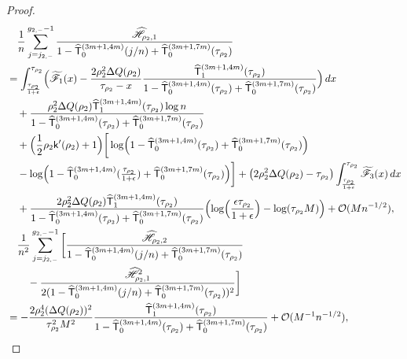 \documentclass[a4paper]{article}
\numberwithin{equation}{section}
\begin{document}
\begin{proof}
\begin{align*}
&\quad \frac{1}{n}
\sum_{j=j_{2,-}}^{g_{2,-}-1}\frac{\widehat{\mathscr{H}}_{\rho_2,1}}{1-\widehat{\mathsf{T}}_0^{(3m+1,4m)}(j/n)+\widehat{\mathsf{T}}_0^{(3m+1,7m)}(\tau_{\rho_2})}
\\
&=
\int_{\frac{\tau_{\rho_2}}{1+\epsilon}}^{\tau_{\rho_2}}
\Bigl(\widetilde{\mathscr{F}}_1(x)
-\frac{2\rho_2^2\Delta Q(\rho_2)}{\tau_{\rho_2}-x}
\frac{
\widehat{\mathsf{T}}_{1}^{(3m+1,4m)}(\tau_{\rho_2})}{1-\widehat{\mathsf{T}}_0^{(3m+1,4m)}(\tau_{\rho_2})+\widehat{\mathsf{T}}_0^{(3m+1,7m)}(\tau_{\rho_2})}
\Bigr) \,dx 
\\
&\quad
+
\frac{\rho_2^2\Delta Q(\rho_2)\widehat{\mathsf{T}}_{1}^{(3m+1,4m)}(\tau_{\rho_2})\log n}{1-\widehat{\mathsf{T}}_0^{(3m+1,4m)}(\tau_{\rho_2})+\widehat{\mathsf{T}}_0^{(3m+1,7m)}(\tau_{\rho_2})}
\\
&
\quad
+
\Bigl(\frac{1}{2}\rho_2\mathsf{k}'(\rho_2)+1\Bigr)
\bigg[
\log\Bigl(1-\widehat{\mathsf{T}}_0^{(3m+1,4m)}(\tau_{\rho_2})+\widehat{\mathsf{T}}_0^{(3m+1,7m)}(\tau_{\rho_2})\Bigr)
\\
&\quad 
-
\log\Bigl(1-\widehat{\mathsf{T}}_0^{(3m+1,4m)}(\tfrac{\tau_{\rho_2}}{1+\epsilon})+\widehat{\mathsf{T}}_0^{(3m+1,7m)}(\tau_{\rho_2})\Bigr)
\bigg]
+\bigl( 
2\rho_2^2\Delta Q(\rho_2)-\tau_{\rho_2}
\bigr)\int_{\frac{\tau_{\rho_2}}{1+\epsilon}}^{\tau_{\rho_2}}\widetilde{\mathscr{F}}_3(x)\,dx
\\
&\quad 
+
\frac{2\rho_2^2\Delta Q(\rho_2)\widehat{\mathsf{T}}_{1}^{(3m+1,4m)}(\tau_{\rho_2})}{1-\widehat{\mathsf{T}}_0^{(3m+1,4m)}(\tau_{\rho_2})+\widehat{\mathsf{T}}_0^{(3m+1,7m)}(\tau_{\rho_2})}
\Bigl( 
\log\Bigl(\frac{\epsilon\tau_{\rho_2}}{1+\epsilon}\Bigr)-\log (\tau_{\rho_2}M)
\Bigr)
+\mathcal{O}(Mn^{-1/2}),
\\
&\quad \frac{1}{n^2}\sum_{j=j_{2,-}}^{g_{2,-}-1}
\bigg[
\frac{\widehat{\mathscr{H}}_{\rho_2,2}}{1-\widehat{\mathsf{T}}_0^{(3m+1,4m)}(j/n)+\widehat{\mathsf{T}}_0^{(3m+1,7m)}(\tau_{\rho_2})}
\\
&\qquad-\frac{\widehat{\mathscr{H}}_{\rho_2,1}^2}{2(1-\widehat{\mathsf{T}}_0^{(3m+1,4m)}(j/n)+\widehat{\mathsf{T}}_0^{(3m+1,7m)}(\tau_{\rho_2}))^2}
\bigg]
\\
&=
-\frac{2\rho_2^4(\Delta Q(\rho_2))^2}{\tau_{\rho_2}^2M^2}
\frac{\widehat{\mathsf{T}}_{1}^{(3m+1,4m)}(\tau_{\rho_2})}{1-\widehat{\mathsf{T}}_0^{(3m+1,4m)}(\tau_{\rho_2})+\widehat{\mathsf{T}}_0^{(3m+1,7m)}(\tau_{\rho_2})}
+\mathcal{O}(M^{-1}n^{-1/2}),

\end{align*}
\end{proof}
\end{document}
